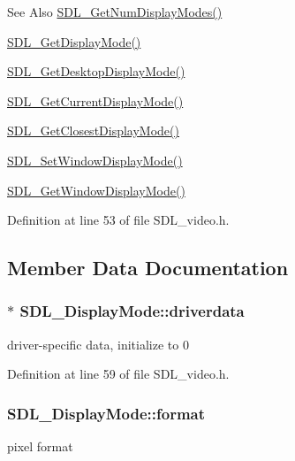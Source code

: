 \begin{DoxySeeAlso}{See Also}
\hyperlink{_s_d_l__video_8h_a5abcf18592f00019c517e791f8ba53fc}{S\-D\-L\-\_\-\-Get\-Num\-Display\-Modes()} 

\hyperlink{_s_d_l__video_8h_a0a53e003ec6ad24dd2bbbcd0ad297311}{S\-D\-L\-\_\-\-Get\-Display\-Mode()} 

\hyperlink{_s_d_l__video_8h_ab97bca68fc068a6ecc3db473c4c0defd}{S\-D\-L\-\_\-\-Get\-Desktop\-Display\-Mode()} 

\hyperlink{_s_d_l__video_8h_a14dce1cb33085b36f08d27b3d8f2335b}{S\-D\-L\-\_\-\-Get\-Current\-Display\-Mode()} 

\hyperlink{_s_d_l__video_8h_a794be92ee0a9efca226fa19a635fa470}{S\-D\-L\-\_\-\-Get\-Closest\-Display\-Mode()} 

\hyperlink{_s_d_l__video_8h_a2ca17d1e857d1560738e002c9935088a}{S\-D\-L\-\_\-\-Set\-Window\-Display\-Mode()} 

\hyperlink{_s_d_l__video_8h_a8185547bc7cb0bbeb400f459792d081a}{S\-D\-L\-\_\-\-Get\-Window\-Display\-Mode()} 
\end{DoxySeeAlso}


Definition at line 53 of file S\-D\-L\-\_\-video.\-h.



\subsection{Member Data Documentation}
\hypertarget{struct_s_d_l___display_mode_a411f93025411da873f37a384ae62bbcf}{
\subsubsection[{driverdata}]{$\ast$ S\-D\-L\-\_\-\-Display\-Mode\-::driverdata}}\label{struct_s_d_l___display_mode_a411f93025411da873f37a384ae62bbcf}
driver-\/specific data, initialize to 0 

Definition at line 59 of file S\-D\-L\-\_\-video.\-h.

\hypertarget{struct_s_d_l___display_mode_ae8120e0a18a99992f039756e1b503680}{
\subsubsection[{format}]{ S\-D\-L\-\_\-\-Display\-Mode\-::format}}\label{struct_s_d_l___display_mode_ae8120e0a18a99992f039756e1b503680}
pixel format 

